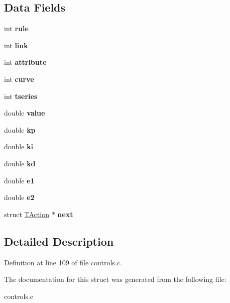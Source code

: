 \subsection*{Data Fields}
\begin{DoxyCompactItemize}
\item 
\mbox{\label{struct_t_action_a80663ac227b6c0ad67024e529adc40aa}} 
int {\bfseries rule}
\item 
\mbox{\label{struct_t_action_af203a1810ce3b44e2b2219c63e0ceff9}} 
int {\bfseries link}
\item 
\mbox{\label{struct_t_action_a5a0a2be2e5e4bc3d94d8425f9a7e7919}} 
int {\bfseries attribute}
\item 
\mbox{\label{struct_t_action_ad61e4ff482e52b3da8c2f5e13dc3c73d}} 
int {\bfseries curve}
\item 
\mbox{\label{struct_t_action_afd15ee95d15c321f272a7c4c6f3e8a9e}} 
int {\bfseries tseries}
\item 
\mbox{\label{struct_t_action_aee90379adb0307effb138f4871edbc5c}} 
double {\bfseries value}
\item 
\mbox{\label{struct_t_action_ac6390bc2d074992cc6ca37d132a5262d}} 
double {\bfseries kp}
\item 
\mbox{\label{struct_t_action_a23e09706a4abb026e1de279c4904e926}} 
double {\bfseries ki}
\item 
\mbox{\label{struct_t_action_a1cf17dd45e85748457863776dcb28335}} 
double {\bfseries kd}
\item 
\mbox{\label{struct_t_action_ab210b200e8dafd3b1613ea08e2db95d3}} 
double {\bfseries e1}
\item 
\mbox{\label{struct_t_action_a6359addf0f8b20983d9c86bb5b5b7da9}} 
double {\bfseries e2}
\item 
\mbox{\label{struct_t_action_adfbbee23e2af03abe1c1f6eee8feff88}} 
struct \hyperlink{struct_t_action}{T\+Action} $\ast$ {\bfseries next}
\end{DoxyCompactItemize}


\subsection{Detailed Description}


Definition at line 109 of file controls.\+c.



The documentation for this struct was generated from the following file\+:\begin{DoxyCompactItemize}
\item 
controls.\+c\end{DoxyCompactItemize}

